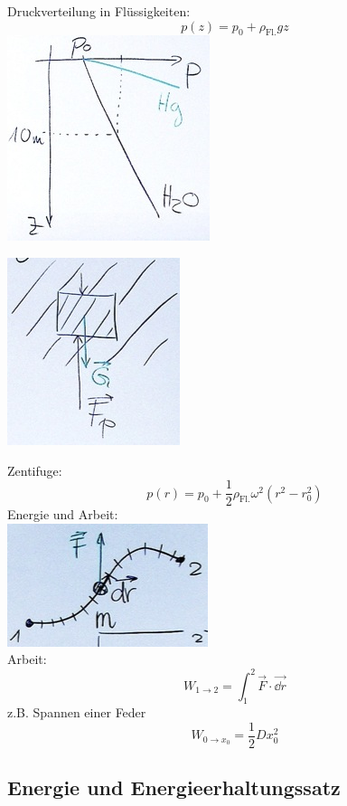 \begin{rep*}[ note = Hydrostatik ]
	Druckverteilung in Flüssigkeiten:
	\[ p(z) = p_0 + \rho_{\text{Fl.}} g z \]
	\includegraphics{Bild70}
	\begin{folge}[ note = Auftrieb ]
		\includegraphics{Bild71}
	\end{folge}
	Zentifuge:
	\[ p(r) = p_0 + \frac{1}{2} \rho_{\text{Fl.}} \omega^2 ( r^2 - r_0^2 ) \]
	Energie und Arbeit: \\
	\includegraphics{Bild72} \\
	Arbeit:
	\[ W_{1 \rightarrow 2} = \int_1^2 \vec{F} \cdot \vec{\dd r} \]
	z.B. Spannen einer Feder
	\[ W_{0 \rightarrow x_0} = \frac{1}{2} D x_0^2 \]
\end{rep*}

\subsection{Energie und Energieerhaltungssatz}
